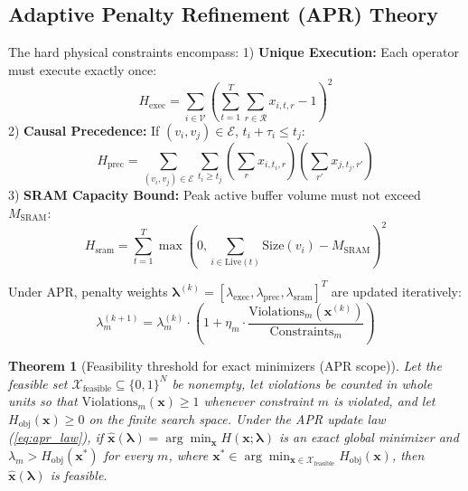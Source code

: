 \documentclass[journal]{IEEEtran}
\newtheorem{theorem}{Theorem}
\theoremstyle{definition}
\begin{document}
\subsection{Adaptive Penalty Refinement (APR) Theory}
The hard physical constraints encompass:
1) \textbf{Unique Execution:} Each operator must execute exactly once:
\begin{equation}
H_{\text{exec}} = \sum_{i \in \mathcal{V}} \left( \sum_{t=1}^T \sum_{r \in \mathcal{R}} x_{i,t,r} - 1 \right)^2
\end{equation}
2) \textbf{Causal Precedence:} If $(v_i, v_j) \in \mathcal{E}$, $t_i + \tau_i \le t_j$:
\begin{equation}
H_{\text{prec}} = \sum_{(v_i, v_j) \in \mathcal{E}} \sum_{t_i \ge t_j} \left(\sum_r x_{i,t_i,r}\right) \left(\sum_{r'} x_{j,t_j,r'}\right)
\end{equation}
3) \textbf{SRAM Capacity Bound:} Peak active buffer volume must not exceed $M_{\text{SRAM}}$:
\begin{equation}
H_{\text{sram}} = \sum_{t=1}^T \max\left(0, \sum_{i \in \text{Live}(t)} \text{Size}(v_i) - M_{\text{SRAM}}\right)^2
\end{equation}

Under APR, penalty weights $\boldsymbol{\lambda}^{(k)} = [\lambda_{\text{exec}}, \lambda_{\text{prec}}, \lambda_{\text{sram}}]^T$ are updated iteratively:
\begin{equation}
\lambda_m^{(k+1)} = \lambda_m^{(k)} \cdot \left( 1 + \eta_m \cdot \frac{\text{Violations}_m(\mathbf{x}^{(k)})}{\text{Constraints}_m} \right)
\label{eq:apr_law}
\end{equation}

\begin{theorem}[Feasibility threshold for exact minimizers (APR scope)]
Let the feasible set $\mathcal{X}_{\text{feasible}} \subseteq \{0,1\}^N$ be nonempty, let violations be counted in whole units so that $\text{Violations}_m(\mathbf{x}) \ge 1$ whenever constraint $m$ is violated, and let $H_{\text{obj}}(\mathbf{x}) \ge 0$ on the finite search space. Under the APR update law (\ref{eq:apr_law}), if $\hat{\mathbf{x}}(\boldsymbol{\lambda}) = \arg\min_{\mathbf{x}} H(\mathbf{x}; \boldsymbol{\lambda})$ is an exact global minimizer and $\lambda_m > H_{\text{obj}}(\mathbf{x}^*)$ for every $m$, where $\mathbf{x}^* \in \arg\min_{\mathbf{x} \in \mathcal{X}_{\text{feasible}}} H_{\text{obj}}(\mathbf{x})$, then $\hat{\mathbf{x}}(\boldsymbol{\lambda})$ is feasible.
\end{theorem}
\end{document}
